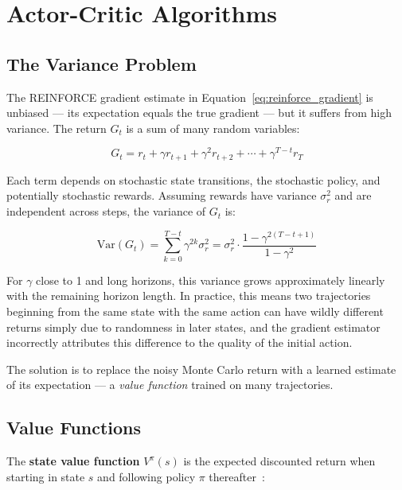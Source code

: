 \documentclass{book}
\begin{document}
\section{Actor-Critic Algorithms}
\label{sec:actor_critic}

\subsection{The Variance Problem}
\label{sec:variance_problem}

The REINFORCE gradient estimate in Equation~\ref{eq:reinforce_gradient}
is unbiased --- its expectation equals the true gradient --- but it
suffers from high variance. The return $G_t$ is a sum of many random
variables:

\begin{equation}
G_t = r_t + \gamma r_{t+1} + \gamma^2 r_{t+2} + \cdots + \gamma^{T-t} r_T
\end{equation}

Each term depends on stochastic state transitions, the stochastic policy,
and potentially stochastic rewards. Assuming rewards have variance
$\sigma_r^2$ and are independent across steps, the variance of $G_t$ is:

\begin{equation}
\label{eq:return_variance}
\mathrm{Var}(G_t) = \sum_{k=0}^{T-t} \gamma^{2k} \sigma_r^2
    = \sigma_r^2 \cdot \frac{1 - \gamma^{2(T-t+1)}}{1-\gamma^2}
\end{equation}

For $\gamma$ close to 1 and long horizons, this variance grows
approximately linearly with the remaining horizon length. In practice,
this means two trajectories beginning from the same state with the same
action can have wildly different returns simply due to randomness in later
states, and the gradient estimator incorrectly attributes this difference
to the quality of the initial action.

The solution is to replace the noisy Monte Carlo return with a learned
estimate of its expectation --- a \emph{value function} trained on many
trajectories.

\subsection{Value Functions}
\label{sec:value_functions}

The \textbf{state value function} $V^\pi(s)$ is the expected discounted
return when starting in state $s$ and following policy $\pi$
thereafter~\cite{sutton2018reinforcement}:
\end{document}
